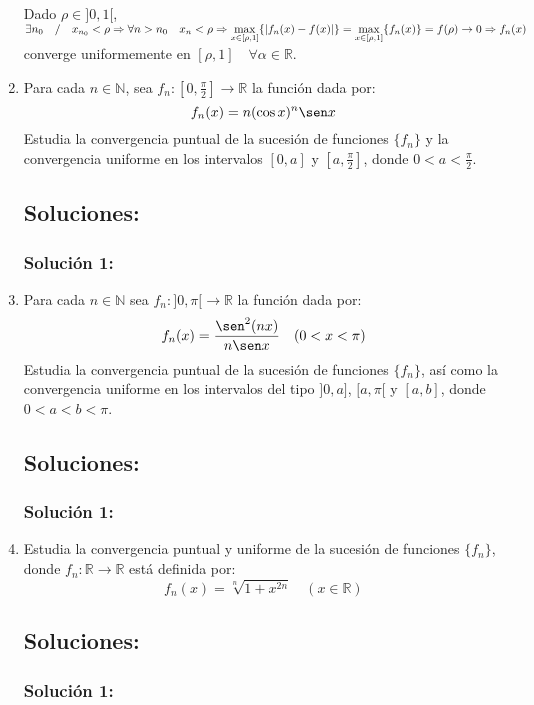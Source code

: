 \documentclass[a4paper, 11pt]{article} %
\begin{document}
\begin{enumerate}
  		Dado $\rho \in ]0,1[$, $\exists n_0 \quad / \quad x_{n_0} < \rho \Rightarrow \forall n > n_0
  		\quad x_n < \rho \Rightarrow \\ \displaystyle{\max_{x \in [\rho,1]} \{|f_n(x) - f(x)|\} } = 
  		\displaystyle{\max_{x \in [\rho,1]} \{f_n(x)\}} = f(\rho) \rightarrow 0 \Rightarrow f_n(x)$
  		converge uniformemente en $[\rho,1] \quad \forall \alpha \in \mathbb{R}$.

	\item Para cada $n \in \mathbb{N}$, sea $f_n: \left[0, \frac{\pi}{2}\right] \rightarrow \mathbb{R}$
	la función dada por:
	$$f_n(x) = n(\cos x)^n \sen x$$
	Estudia la convergencia puntual de la sucesión de funciones $\{f_n\}$ y la convergencia
	uniforme en los intervalos $[0, a]$ y $\left[a,\frac{\pi}{2}\right]$, donde $0 < a < \frac{\pi}{2}$.
	\subsection*{Soluciones:}
		\subsubsection*{Solución 1:}
	
	\item Para cada $n \in \mathbb{N}$ sea $f_n: ]0, \pi[ \rightarrow \mathbb{R}$ la función dada por:
	$$f_n(x) = \frac{\sen^2(nx)}{n\sen x} \quad (0 < x < \pi)$$
	Estudia la convergencia puntual de la sucesión de funciones $\{f_n\}$, así como la convergencia
	uniforme en los intervalos del tipo $]0, a]$, $[a,\pi[$ y $[a,b]$, donde $0 < a < b < \pi$.
	\subsection*{Soluciones:}
		\subsubsection*{Solución 1:}
	
	\item Estudia la convergencia puntual y uniforme de la sucesión de funciones $\{f_n\}$, donde
	$f_n: \mathbb{R} \rightarrow \mathbb{R}$ está definida por:
	$$f_n(x) = \sqrt[n]{1+x^{2n}} \quad (x \in \mathbb{R})$$
	\subsection*{Soluciones:}
		\subsubsection*{Solución 1:}
	

\end{enumerate}
\end{document}
